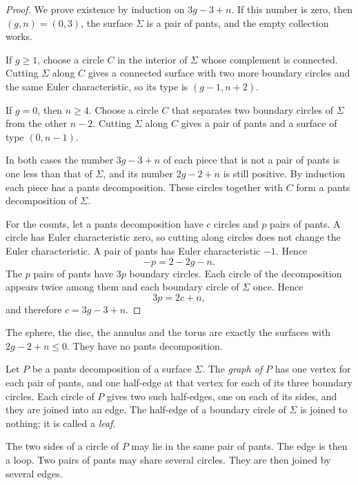 \begin{proof}
We prove existence by induction on
$3g-3+n$.  If this number is zero, then
$(g,n)=(0,3)$, the surface $\Sigma$ is a
pair of pants, and the empty collection
works.

If $g\geq 1$, choose a circle $C$ in the
interior of $\Sigma$ whose complement is
connected.  Cutting $\Sigma$ along $C$ gives
a connected surface with two more boundary
circles and the same Euler characteristic,
so its type is $(g-1,n+2)$.

If $g=0$, then $n\geq 4$.  Choose a circle
$C$ that separates two boundary circles of
$\Sigma$ from the other $n-2$.  Cutting
$\Sigma$ along $C$ gives a pair of pants and
a surface of type $(0,n-1)$.

In both cases the number $3g-3+n$ of each
piece that is not a pair of pants is one
less than that of $\Sigma$, and its number
$2g-2+n$ is still positive.  By induction
each piece has a pants decomposition.  These
circles together with $C$ form a pants
decomposition of $\Sigma$.

For the counts, let a pants decomposition
have $c$ circles and $p$ pairs of pants.  A
circle has Euler characteristic zero, so
cutting along circles does not change the
Euler characteristic.  A pair of pants has
Euler characteristic $-1$.  Hence
$$
-p=2-2g-n.
$$
The $p$ pairs of pants have $3p$ boundary
circles.  Each circle of the decomposition
appears twice among them and each boundary
circle of $\Sigma$ once.  Hence
$$
3p=2c+n,
$$
and therefore $c=3g-3+n$.
\end{proof}

\noindent
The sphere, the disc, the annulus and the
torus are exactly the surfaces with
$2g-2+n\leq 0$.  They have no pants
decomposition.

\begin{definition}
\label{definition-graph-of-pants-decomposition}
Let $P$ be a pants decomposition of a surface
$\Sigma$.  The {\it graph of $P$} has one
vertex for each pair of pants, and one
half-edge at that vertex for each of its
three boundary circles.  Each circle of $P$
gives two such half-edges, one on each of
its sides, and they are joined into an edge.
The half-edge of a boundary circle of
$\Sigma$ is joined to nothing; it is called
a {\it leaf}.
\end{definition}

\noindent
The two sides of a circle of $P$ may lie in
the same pair of pants.  The edge is then a
loop.  Two pairs of pants may share several
circles.  They are then joined by several
edges.


